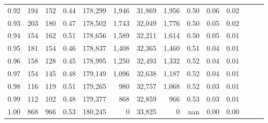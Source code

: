 \begin{tabular}{rrrrrrrrrrrrrr}
0.92 &    194 &  152 &  0.44 &  178,299 &    1,946 &  31,869 &   1,956 &  0.50 &  0.06 &      0.02 \\
0.93 &    203 &  180 &  0.47 &  178,502 &    1,743 &  32,049 &   1,776 &  0.50 &  0.05 &      0.02 \\
0.94 &    154 &  162 &  0.51 &  178,656 &    1,589 &  32,211 &   1,614 &  0.50 &  0.05 &      0.01 \\
0.95 &    181 &  154 &  0.46 &  178,837 &    1,408 &  32,365 &   1,460 &  0.51 &  0.04 &      0.01 \\
0.96 &    158 &  128 &  0.45 &  178,995 &    1,250 &  32,493 &   1,332 &  0.52 &  0.04 &      0.01 \\
0.97 &    154 &  145 &  0.48 &  179,149 &    1,096 &  32,638 &   1,187 &  0.52 &  0.04 &      0.01 \\
0.98 &    116 &  119 &  0.51 &  179,265 &      980 &  32,757 &   1,068 &  0.52 &  0.03 &      0.01 \\
0.99 &    112 &  102 &  0.48 &  179,377 &      868 &  32,859 &     966 &  0.53 &  0.03 &      0.01 \\
1.00 &    868 &  966 &  0.53 &  180,245 &        0 &  33,825 &       0 &   nan &  0.00 &      0.00 \\
\bottomrule
\end{tabular}
